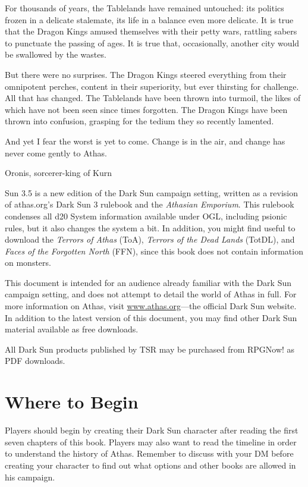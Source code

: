 {For thousands of years, the Tablelands have remained untouched: its politics frozen in a delicate stalemate, its life in a balance even more delicate. It is true that the Dragon Kings amused themselves with their petty wars, rattling sabers to punctuate the passing of ages. It is true that, occasionally, another city would be swallowed by the wastes.

But there were no surprises. The Dragon Kings steered everything from their omnipotent perches, content in their superiority, but ever thirsting for challenge. All that has changed. The Tablelands have been thrown into turmoil, the likes of which have not been seen since times forgotten. The Dragon Kings have been thrown into confusion, grasping for the tedium they so recently lamented.

And yet I fear the worst is yet to come. Change is in the air, and change has never come gently to Athas.}{Oronis, sorcerer-king of Kurn}


 Sun 3.5 is a new edition of the {\tableheader Dark Sun} campaign setting, written as a revision of athas.org's {\tableheader Dark Sun} 3 rulebook and the \emph{Athasian Emporium}. This rulebook condenses all d20 System information available under OGL, including psionic rules, but it also changes the system a bit. In addition, you might find useful to download the \emph{Terrors of Athas} (ToA), \emph{Terrors of the Dead Lands} (TotDL), and \emph{Faces of the Forgotten North} (FFN), since this book does not contain information on monsters.

This document is intended for an audience already familiar with the {\tableheader Dark Sun} campaign setting, and does not attempt to detail the world of Athas in full. For more information on Athas, visit \url{www.athas.org}---the official {\tableheader Dark Sun} website. In addition to the latest version of this document, you may find other {\tableheader Dark Sun} material available as free downloads.

All {\tableheader Dark Sun} products published by TSR may be purchased from RPGNow! as PDF downloads.





\section{Where to Begin}
Players should begin by creating their {\tableheader Dark Sun} character after reading the first seven chapters of this book. Players may also want to read the timeline in order to understand the history of Athas. Remember to discuss with your DM before creating your character to find out what options and other books are allowed in his campaign.

